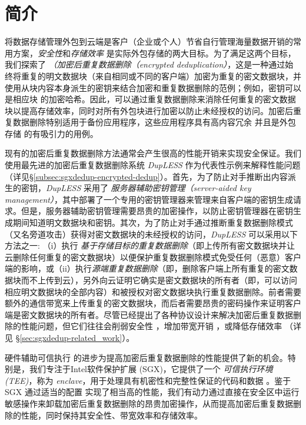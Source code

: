 \section{简介}
\label{sec:sgxdedup-introduction}

将数据存储管理外包到云端是客户（企业或个人）节省自行管理海量数据开销的常用方案，\textit{安全性}和\textit{存储效率} 是实际外包存储的两大目标。为了满足这两个目标，我们探索了 \textit{（加密后重复数据删除（encrypted deduplication）}，这是一种通过始终将重复的明文数据块（来自相同或不同的客户端）加密为重复的密文数据块，并使用从块内容本身派生的密钥来结合加密和重复数据删除的范例；例如，密钥可以是相应块 \cite{douceur02} 的加密哈希。因此，可以通过重复数据删除来消除任何重复的密文数据块以提高存储效率，同时对所有外包块进行加密以防止未经授权的访问。加密后重复数据删除特别适用于备份应用程序，这些应用程序具有高内容冗余 \cite{wallace12} 并且是外包存储 \cite{hasan05,kotla07,varble09} 的有吸引力的用例。
  
现有的加密后重复数据删除方法通常会产生很高的性能开销来实现安全保证。我们使用最先进的加密后重复数据删除系统 {\em DupLESS} \cite{bellare13b} 作为代表性示例来解释性能问题（详见\S\ref{subsec:sgxdedup-encrypted-dedup}）。首先，为了防止对手推断出内容派生的密钥，{\em DupLESS} 采用了 \textit{服务器辅助密钥管理（server-aided key management）}，其中部署了一个专用的密钥管理器来管理来自客户端的密钥生成请求。但是，服务器辅助密钥管理需要昂贵的加密操作，以防止密钥管理器在密钥生成期间知道明文数据块和密钥。其次，为了防止对手通过推断重复数据删除模式（又名旁道攻击\cite{harnik2010side, halevi2011proofs}）获得对密文数据块的未经授权的访问，{\em DupLESS} 可以采用以下方法之一: （i）执行 \textit{基于存储目标的重复数据删除}（即上传所有密文数据块并让云删除任何重复的密文数据块）以便保护重复数据删除模式免受任何（恶意）客户端的影响，或（ii）执行\textit{源端重复数据删除}（即，删除客户端上所有重复的密文数据块而不上传到云），另外向云证明它确实是密文数据块的所有者（即，可以访问相应明文数据块的全部内容）和被授权对密文数据块执行重复数据删除。前者需要额外的通信带宽来上传重复的密文数据块，而后者需要昂贵的密码操作来证明客户端是密文数据块的所有者。尽管已经提出了各种协议设计来解决加密后重复数据删除的性能问题，但它们往往会削弱安全性 \cite{li20b,xu2013weak,pietro12}，增加带宽开销 \cite{harnik10,li15}，或降低存储效率 \cite{zhou2015secdep, qin17,li20b}（详见 \S\ref{sec:sgxdedup-related_work}）。
  
硬件辅助可信执行 \cite{trustzone,sgx,Mktem,Amdsev} 的进步为提高加密后重复数据删除的性能提供了新的机会。特别是，我们专注于Intel软件保护扩展 (SGX)，它提供了一个 \textit{ 可信执行环境 (TEE)}，称为 \textit{ enclave}，用于处理具有机密性和完整性保证的代码和数据 \cite{baumann14 }。鉴于 SGX 通过适当的配置 \cite{harnik18} 实现了相当高的性能，我们有动力通过直接在安全区中运行敏感操作来卸载加密后重复数据删除的昂贵加密操作，从而提高加密后重复数据删除的性能，同时保持其安全性、带宽效率和存储效率。


